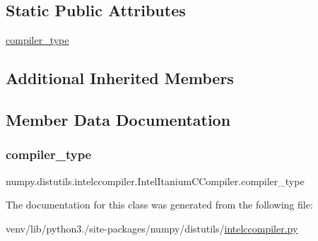 \subsection*{Static Public Attributes}
\begin{DoxyCompactItemize}
\item 
\hyperlink{classnumpy_1_1distutils_1_1intelccompiler_1_1IntelItaniumCCompiler_af5add49be92f214727431f30035017d4}{compiler\+\_\+type}
\end{DoxyCompactItemize}
\subsection*{Additional Inherited Members}


\subsection{Member Data Documentation}
\mbox{\label{classnumpy_1_1distutils_1_1intelccompiler_1_1IntelItaniumCCompiler_af5add49be92f214727431f30035017d4}} 
\subsubsection{\texorpdfstring{compiler\+\_\+type}{compiler\_type}}
{\footnotesize\ttfamily numpy.\+distutils.\+intelccompiler.\+Intel\+Itanium\+C\+Compiler.\+compiler\+\_\+type\hspace{0.3cm}{\ttfamily [static]}}



The documentation for this class was generated from the following file\+:\begin{DoxyCompactItemize}
\item 
venv/lib/python3./site-\/packages/numpy/distutils/\hyperlink{intelccompiler_8py}{intelccompiler.\+py}\end{DoxyCompactItemize}
